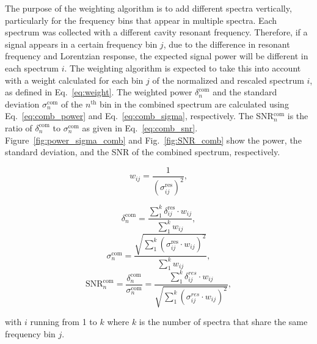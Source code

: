 The purpose of the weighting algorithm is to add different spectra vertically,
 particularly for the frequency bins that appear in multiple spectra.  
Each spectrum was collected with a different cavity resonant frequency. 
Therefore, if a signal appears in a certain frequency bin $j$, due to the
 difference in resonant frequency and Lorentzian response, the expected signal
 power will be different in each spectrum $i$. The weighting algorithm is 
expected to take this into account with a weight calculated for each bin $j$ of
 the normalized and rescaled spectrum $i$, as defined in Eq.~\eqref{eq:weight}.
The weighted power $\delta^\text{com}_{n}$ and the standard deviation 
$\sigma^\text{com}_{n}$ of the $n^\text{th}$ bin in the combined spectrum are 
calculated using Eq.~\eqref{eq:comb_power} and Eq.~\eqref{eq:comb_sigma}, 
respectively. The SNR$^\text{com}_{n}$ is the ratio of 
$\delta^\text{com}_{n}$ to 
$\sigma^\text{com}_{n}$ as given in Eq.~\eqref{eq:comb_snr}. 
Figure~\ref{fig:power_sigma_comb} and Fig.~\ref{fig:SNR_comb} show the power, 
the standard deviation, and the SNR of the combined spectrum, respectively.


\begin{equation}
    \label{eq:weight}
    {w_{ij}} = \frac{1}{(\sigma_{ij}^\text{res})^{2}},
\end{equation}

\begin{equation}
    \label{eq:comb_power}
    \delta_{n}^\text{com} = \frac{ \sum_{1}^{k}\delta_{ij}^\text{res} \cdot {w_{ij}}}{\sum_{1}^{k} {w_{ij}}},
\end{equation}
\begin{equation}
    \label{eq:comb_sigma}
    \sigma_{n}^\text{com} = \frac{ \sqrt{\sum_{1}^{k}(\sigma_{ij}^\text{res} \cdot {w_{ij}})^2}}{\sum_{1}^{k} {w_{ij}}},
\end{equation}
\begin{equation}
    \label{eq:comb_snr}
    \text{SNR}_{n}^\text{com} = \frac{\delta^\text{com}_{n}}{\sigma^\text{com}_{n}}= \frac{\sum_{1}^{k}\delta_{ij}^{res} \cdot {w_{ij}}}{ \sqrt{\sum_{1}^{k}(\sigma_{ij}^{res} \cdot {w_{ij}})^2}},
\end{equation}

with $i$ running from 1 to $k$ where $k$ is the 
number of spectra that share the same frequency bin $j$.

